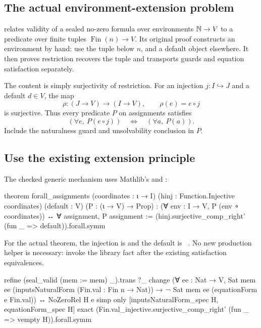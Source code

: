 \subsection{The actual environment-extension problem}

 relates validity of a sealed
no-zero formula over environments $\mathbb N\to V$ to a predicate over finite tuples
$\operatorname{Fin}(n)\to V$. Its original proof constructs an environment by
hand: use the tuple below $n$, and a default object elsewhere. It then proves
restriction recovers the tuple and transports guards and equation
satisfaction separately.

The content is simply surjectivity of restriction. For an injection
$j:I\hookrightarrow J$ and a default $d\in V$, the map
\[
 \rho:(J\to V)\longrightarrow(I\to V),\qquad
 \rho(e)=e\circ j
\]
is surjective. Thus every predicate $P$ on assignments satisfies
\[
       (\forall e,\ P(e\circ j))
       \quad\Longleftrightarrow\quad
       (\forall a,\ P(a)).
 \tag{6}
\]
Include the naturalness guard and unsolvability conclusion in $P$.

\subsection{Use the existing extension principle}

The checked generic mechanism uses Mathlib's
 and
:

\begin{Lean}
theorem forall_assignments
    (coordinates : ι → I)
    (hinj : Function.Injective coordinates)
    (default : V) (P : (ι → V) → Prop) :
    (∀ env : I → V, P (env ∘ coordinates)) ↔
      ∀ assignment, P assignment :=
  (hinj.surjective_comp_right' (fun _ => default)).forall.symm
\end{Lean}

For the actual theorem, the injection is  and the default is
~. No new production helper is necessary: invoke the library
fact after the existing satisfaction equivalences.

\begin{Lean}
  refine (seal_valid (mem := mem) _).trans ?_
  change (∀ ee : Nat → V,
    Sat mem ee (inputsNaturalForm (Fin.val : Fin n → Nat)) →
      ¬ Sat mem ee (equationForm e Fin.val)) ↔ NoZeroRel H e
  simp only [inputsNaturalForm_spec H, equationForm_spec H]
  exact
    (Fin.val_injective.surjective_comp_right'
      (fun _ => vempty H)).forall.symm
\end{Lean}

